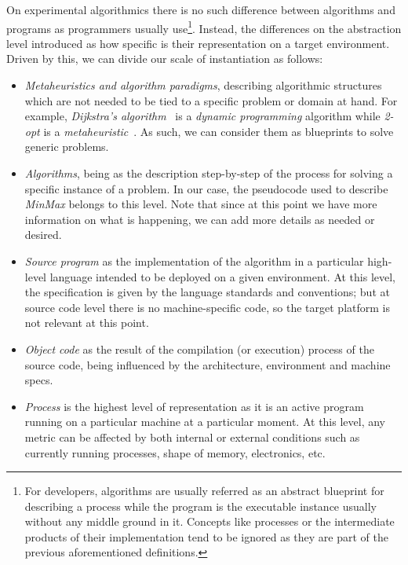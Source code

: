 On experimental algorithmics there is no such difference between algorithms and programs as programmers usually use\footnote{For developers, algorithms are usually referred as an abstract blueprint for describing a process while the program is the executable instance usually without any middle ground in it. Concepts like processes or the intermediate products of their implementation tend to be ignored as they are part of the previous aforementioned definitions.}. Instead, the differences on the abstraction level introduced as how specific is their representation on a target environment. Driven by this, we can divide our scale of instantiation as follows:\\

\begin{itemize}
    \item \textit{Metaheuristics and algorithm paradigms}, describing algorithmic structures which are not needed to be tied to a specific problem or domain at hand. For example, \textit{Dijkstra's algorithm}~\cite{10.5555/1614191} is a \emph{dynamic programming} algorithm while \textit{2-opt} is a \emph{metaheuristic}~\cite{10.2307/167074}. As such, we can consider them as blueprints to solve generic problems.
    \item \textit{Algorithms}, being as the description step-by-step of the process for solving a specific instance of a problem. In our case, the pseudocode used to describe \textit{MinMax} belongs to this level. Note that since at this point we have more information on what is happening, we can add more details as needed or desired.
    \item \textit{Source program} as the implementation of the algorithm in a particular high-level language intended to be deployed on a given environment. At this level, the specification is given by the language standards and conventions; but at source code level there is no machine-specific code, so the target platform is not relevant at this point.
    \item \textit{Object code} as the result of the compilation (or execution) process of the source code, being influenced by the architecture, environment and machine specs.
    \item \textit{Process} is the highest level of representation as it is an active program running on a particular machine at a particular moment. At this level, any metric can be affected by both internal or external conditions such as currently running processes, shape of memory, electronics, etc.
\end{itemize}

